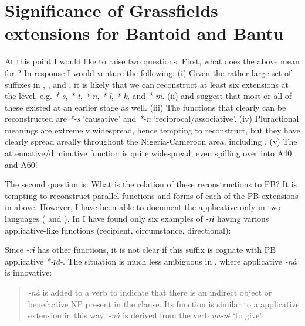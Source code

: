 \documentclass[output=paper]{langsci/langscibook}
\begin{document}
\section{Significance of Grassfields extensions for Bantoid and Bantu}
\largerpage
At this point I would like to raise two questions. First, what does the above mean for ? In response I would venture the following: (i) Given the rather large set of suffixes in , , and , it is likely that we can reconstruct at least six extensions at the  level, e.g. \textit{*-s}, \textit{*-t}, \textit{*-n}, \textit{*-l}, \textit{*-k},  and \textit{*-m}. (ii)  and  suggest that most or all of these existed at an earlier  stage as well. (iii) The functions that clearly can be reconstructed are \textit{*-s} ‘causative’ and \textit{*-n} ‘reciprocal/associative’. (iv) Pluractional meanings are extremely widespread, hence tempting to reconstruct, but they have clearly spread areally throughout the Nigeria-Cameroon area, including  \citep{Newman1990}. (v) The attenuative/diminutive function is quite widespread, even spilling over into A40 and A60!

The second question is: What is the relation of these reconstructions to PB? It is tempting to reconstruct parallel functions and forms of each of the PB extensions in  above. However, I have been able to document the applicative only in two languages ( and ). In  I have found only six examples of \textit{-rɨ} having various applicative-like functions (recipient, circumstance, directional): 
 
\ea%
    \label{ex:proto:24}
\z

\noindent
Since \textit{-rɨ} has other functions, it is not clear if this suffix is cognate with PB applicative \textit{*-ɪd-}. The situation is much less ambiguous in , where applicative \textit{-nà} is innovative:

\begin{quote}
\textit{-nà} is added to a verb to indicate that there is an indirect object or benefactive NP present in the clause. Its function is similar to a  applicative extension in this way. \textit{-nà} is derived from the verb \textit{nà-nɨ} ‘to give’. \citep[8]{Thwing2006}
\end{quote}
\end{document}
